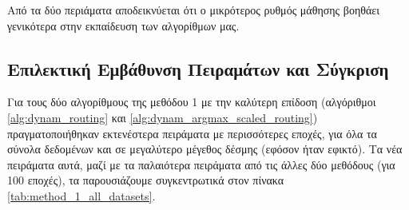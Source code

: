 \begin{table}[h]
    \begin{center}
    \end{center}
    \caption[]{\label{tab:method_1_hyperparameter_tuning_cifar10_alg4}Πειράματα στο  για την αναζήτηση υπερπαραμέτρων στον αλγόριθμο  (αλγόριθμος \ref{alg:dynam_max_routing}) για 30 εποχές.}
\end{table}

Από τα δύο περιάματα αποδεικνύεται ότι ο μικρότερος ρυθμός μάθησης βοηθάει γενικότερα στην εκπαίδευση των αλγορίθμων μας.


\subsection{Επιλεκτική Εμβάθυνση Πειραμάτων και Σύγκριση}
Για τους δύο αλγορίθμους της μεθόδου 1 με την καλύτερη επίδοση (αλγόριθμοι \ref{alg:dynam_routing} και \ref{alg:dynam_argmax_scaled_routing}) πραγματοποιήθηκαν εκτενέστερα πειράματα με περισσότερες εποχές, για όλα τα σύνολα δεδομένων και σε μεγαλύτερο μέγεθος δέσμης (εφόσον ήταν εφικτό). Τα νέα πειράματα αυτά, μαζί με τα παλαιότερα πειράματα από τις άλλες δύο μεθόδους (για 100 εποχές), τα παρουσιάζουμε συγκεντρωτικά στον πίνακα \ref{tab:method_1_all_datasets}.


